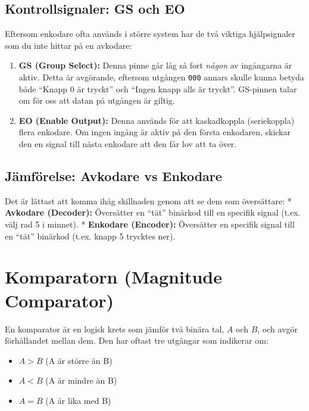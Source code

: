 \documentclass[
  swedish,
  letterpaper,
  oneside,
  openany]{book}
\providecommand{\tightlist}{%
  \setlength{\itemsep}{0pt}\setlength{\parskip}{0pt}}
\begin{document}
\subsection{Kontrollsignaler: GS och
EO}\label{kontrollsignaler-gs-och-eo}

Eftersom enkodare ofta används i större system har de två viktiga
hjälpsignaler som du inte hittar på en avkodare:

\begin{enumerate}
\def\labelenumi{\arabic{enumi}.}
\tightlist
\item
  \textbf{GS (Group Select):} Denna pinne går låg så fort \emph{någon}
  av ingångarna är aktiv. Detta är avgörande, eftersom utgången
  \texttt{000} annars skulle kunna betyda både ``Knapp 0 är tryckt'' och
  ``Ingen knapp alls är tryckt''. GS-pinnen talar om för oss att datan
  på utgången är giltig.
\item
  \textbf{EO (Enable Output):} Denna används för att kaskadkoppla
  (seriekoppla) flera enkodare. Om ingen ingång är aktiv på den första
  enkodaren, skickar den en signal till nästa enkodare att den får lov
  att ta över.
\end{enumerate}

\subsection{Jämförelse: Avkodare vs
Enkodare}\label{juxe4mfuxf6relse-avkodare-vs-enkodare}

Det är lättast att komma ihåg skillnaden genom att se dem som
översättare: * \textbf{Avkodare (Decoder):} Översätter en ``tät''
binärkod till en specifik signal (t.ex. välj rad 5 i minnet). *
\textbf{Enkodare (Encoder):} Översätter en specifik signal till en
``tät'' binärkod (t.ex. knapp 5 trycktes ner).

\section{Komparatorn (Magnitude
Comparator)}\label{komparatorn-magnitude-comparator}

En komparator är en logisk krets som jämför två binära tal, \(A\) och
\(B\), och avgör förhållandet mellan dem. Den har oftast tre utgångar
som indikerar om:

\begin{itemize}
\tightlist
\item
  \(A > B\) (A är större än B)
\item
  \(A < B\) (A är mindre än B)
\item
  \(A = B\) (A är lika med B)
\end{itemize}
\end{document}
